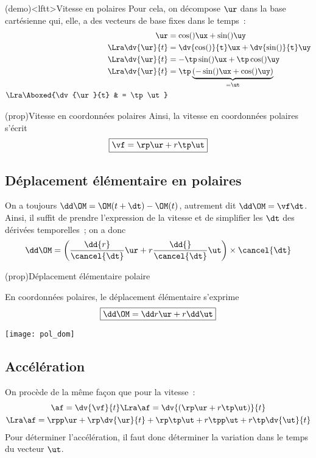 \documentclass[../../main/main.tex]{subfiles}
\begin{document}
\begin{tcb*}(demo)<lftt>{Vitesse en polaires}
	Pour cela, on décompose $\ur$ dans la base cartésienne qui, elle, a des
	vecteurs de base fixes dans le temps~:
	\begin{align*}
		\ur                 & = \cos(\tt)\ux + \sin(\tt)\uy
		\\\Lra
		\dv{\ur}{t}         & = \dv{\cos(\tt)}{t}\ux + \dv{\sin(\tt)}{t}\uy
		\\\Lra
		\dv{\ur}{t}         & = -\tp\sin(\tt)\ux + \tp\cos(\tt)\uy
		\\\Lra
		\dv{\ur}{t}         & = \tp
		\underbrace{\left(-\sin(\tt)\ux + \cos(\tt)\uy\right)}_{= \ut}
		\\\Lra
		\Aboxed{\dv{\ur}{t} & = \tp\ut}
	\end{align*}
\end{tcb*}

\begin{tcb*}(prop){Vitesse en coordonnées polaires}
	Ainsi, la vitesse en coordonnées polaires s'écrit
	\[\boxed{\vf = \rp\ur + r\tp\ut}\]
\end{tcb*}

\subsection{Déplacement élémentaire en polaires}
On a toujours $\dd\OM = \OM(t+\dt) - \OM(t)$, autrement dit $\dd\OM = \vf\dt$.
Ainsi, il suffit de prendre l'expression de la vitesse et de simplifier les
$\dt$ des dérivées temporelles~; on a donc
\begin{gather*}
	\dd\OM = \left(\frac{\dd{r}}{\cancel{\dt}}\ur + r
	\frac{\dd{\tt}}{\cancel{\dt}}\ut\right)\times\cancel{\dt}
\end{gather*}

\begin{tcb*}(prop){Déplacement élémentaire polaire}
	\begin{minipage}{0.70\linewidth}
		En coordonnées polaires, le déplacement élémentaire s'exprime
		\[\boxed{\dd\OM = \dd r\ur + r\dd\tt\ut}\]
	\end{minipage}
	\hfill
	\begin{minipage}{0.25\linewidth}
		\begin{center}
			\texttt{[image: pol\_dom]}
		\end{center}
	\end{minipage}
\end{tcb*}

\subsection{Accélération}
On procède de la même façon que pour la vitesse~:
\begin{gather*}
	\af = \dv{\vf}{t}
	\Lra
	\af = \dv{\left(\rp\ur + r\tp\ut\right)}{t}
	\\\Lra
	\af = \rpp\ur + \rp \dv{\ur}{t} + \rp\tp\ut + r\tpp\ut + r\tp \dv{\ut}{t}
\end{gather*}
Pour déterminer l'accélération, il faut donc déterminer la variation dans le
temps du vecteur $\ut$.
\end{document}
